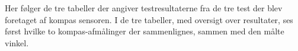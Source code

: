 \label{appendix:kompas_test}
Her følger de tre tabeller der angiver testresultaterne fra de tre test der blev foretaget af kompas sensoren.
I de tre tabeller, med oversigt over resultater, ses først hvilke to kompas-afmålinger der sammenlignes, sammen med den målte vinkel.



